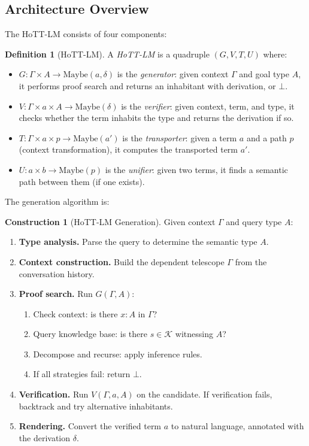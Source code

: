\documentclass[11pt,a4paper]{article}
\theoremstyle{plain}
\theoremstyle{definition}
\newtheorem{definition}[theorem]{Definition}
\newtheorem{construction}[theorem]{Construction}
\theoremstyle{remark}
\begin{document}
\subsection{Architecture Overview}

The HoTT-LM consists of four components:

\begin{definition}[HoTT-LM]\label{def:hottlm}
A \emph{HoTT-LM} is a quadruple $(G, V, T, U)$ where:
\begin{itemize}[nosep]
  \item $G : \Gamma \times A \to \mathrm{Maybe}(a, \delta)$ is the \emph{generator}: given context $\Gamma$ and goal type $A$, it performs proof search and returns an inhabitant with derivation, or $\bot$.
  \item $V : \Gamma \times a \times A \to \mathrm{Maybe}(\delta)$ is the \emph{verifier}: given context, term, and type, it checks whether the term inhabits the type and returns the derivation if so.
  \item $T : \Gamma \times a \times p \to \mathrm{Maybe}(a')$ is the \emph{transporter}: given a term $a$ and a path $p$ (context transformation), it computes the transported term $a'$.
  \item $U : a \times b \to \mathrm{Maybe}(p)$ is the \emph{unifier}: given two terms, it finds a semantic path between them (if one exists).
\end{itemize}
\end{definition}

The generation algorithm is:

\begin{construction}[HoTT-LM Generation]\label{con:generation}
Given context $\Gamma$ and query type $A$:
\begin{enumerate}[nosep]
  \item \textbf{Type analysis.} Parse the query to determine the semantic type $A$.
  \item \textbf{Context construction.} Build the dependent telescope $\Gamma$ from the conversation history.
  \item \textbf{Proof search.} Run $G(\Gamma, A)$:
    \begin{enumerate}[nosep,label=(\alph*)]
      \item Check context: is there $x : A$ in $\Gamma$?
      \item Query knowledge base: is there $s \in \mathcal{K}$ witnessing $A$?
      \item Decompose and recurse: apply inference rules.
      \item If all strategies fail: return $\bot$.
    \end{enumerate}
  \item \textbf{Verification.} Run $V(\Gamma, a, A)$ on the candidate.
  If verification fails, backtrack and try alternative inhabitants.
  \item \textbf{Rendering.} Convert the verified term $a$ to natural language, annotated with the derivation $\delta$.
\end{enumerate}
\end{construction}
\end{document}
